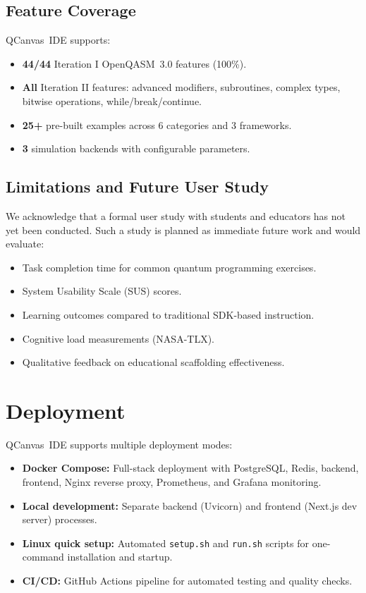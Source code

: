 \documentclass[conference]{IEEEtran}
\begin{document}
\subsection{Feature Coverage}

QCanvas~IDE supports:
\begin{itemize}
    \item \textbf{44/44} Iteration I OpenQASM~3.0 features (100\%).
    \item \textbf{All} Iteration II features: advanced modifiers, subroutines, complex types, bitwise operations, while/break/continue.
    \item \textbf{25+} pre-built examples across 6 categories and 3 frameworks.
    \item \textbf{3} simulation backends with configurable parameters.
\end{itemize}

\subsection{Limitations and Future User Study}

We acknowledge that a formal user study with students and educators has not yet been conducted. Such a study is planned as immediate future work and would evaluate:
\begin{itemize}
    \item Task completion time for common quantum programming exercises.
    \item System Usability Scale (SUS) scores.
    \item Learning outcomes compared to traditional SDK-based instruction.
    \item Cognitive load measurements (NASA-TLX).
    \item Qualitative feedback on educational scaffolding effectiveness.
\end{itemize}

\section{Deployment}
\label{sec:deployment}

QCanvas~IDE supports multiple deployment modes:

\begin{itemize}
    \item \textbf{Docker Compose:} Full-stack deployment with PostgreSQL, Redis, backend, frontend, Nginx reverse proxy, Prometheus, and Grafana monitoring.
    \item \textbf{Local development:} Separate backend (Uvicorn) and frontend (Next.js dev server) processes.
    \item \textbf{Linux quick setup:} Automated \texttt{setup.sh} and \texttt{run.sh} scripts for one-command installation and startup.
    \item \textbf{CI/CD:} GitHub Actions pipeline for automated testing and quality checks.
\end{itemize}
\end{document}
